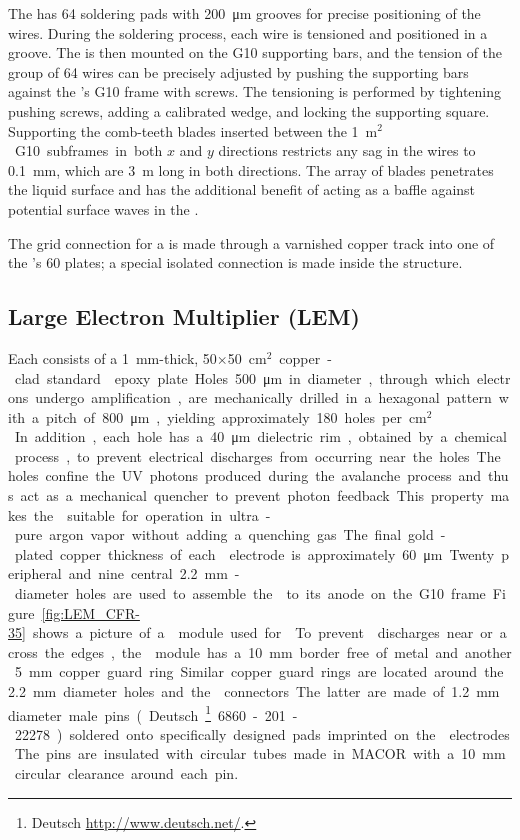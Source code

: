 The  has \num{64} soldering pads with \SI{200}{\micro\meter} grooves for precise positioning of the wires. During the %
soldering process, each wire is tensioned and positioned in a groove. The  is then mounted on the G10 supporting bars, and the tension of the group of \num{64} wires can be precisely adjusted by pushing the supporting bars against the 's G10 frame with screws. The tensioning is performed by tightening pushing screws, adding a calibrated wedge, and locking the supporting square.
Supporting the comb-teeth blades inserted between the \SI{1}{m$^2$} G10 subframes in both $x$ and $y$ directions restricts any sag in the wires to \SI{0.1}{mm}, which are \SI{3}{m} long in both directions. The array of blades penetrates the liquid surface and has the additional benefit of acting as a baffle against potential surface waves in the .

The grid  connection for a  is made through a varnished copper track into one of the 's \num{60}  plates; a special isolated connection  is made inside the  structure.

\subsection{Large Electron Multiplier (LEM)}
\label{sec:fddp-crp-lem}

Each  consists of a \SI{1}{mm}-thick,  \num{50}$\times$\SI{50}{cm$^{2}$} copper-clad standard  epoxy plate. Holes \SI{500}{\micro\meter} in diameter, through which electrons undergo amplification, are mechanically drilled in a hexagonal pattern with a pitch of \SI{800}{\micro\meter}, yielding approximately \num{180} holes per \si{cm$^2$}. In addition, each hole has a  \SI{40}{\micro\meter} dielectric rim, obtained by a chemical process, to prevent electrical discharges from occurring near the holes. The holes confine the UV photons produced during the avalanche process and thus act as a mechanical quencher to prevent photon feedback. This property makes the  suitable for operation in ultra-pure argon vapor without adding a quenching gas. The final gold-plated copper thickness of each  electrode is approximately  \SI{60}{\micro\meter}. Twenty peripheral and nine central \SI{2.2}{mm}-diameter holes are used to assemble the   to its anode on the G10 frame. Figure~\ref{fig:LEM_CFR-35} shows a picture of a  module used for  . To prevent  discharges near or across the edges, the  module has a  \SI{10}{mm} border free of metal and another \SI{5}{mm} copper guard ring. Similar copper guard rings are located around the \SI{2.2}{mm} diameter holes and the  connectors. The latter are made of \SI{1.2}{mm} diameter male pins (Deutsch\footnote{Deutsch\texttrademark{} \url{http://www.deutsch.net/}.} 6860-201-22278.) soldered onto specifically designed pads imprinted on the  electrodes. The pins are insulated with circular tubes made in MACOR with a \SI{10}{mm} circular clearance around each pin. 

